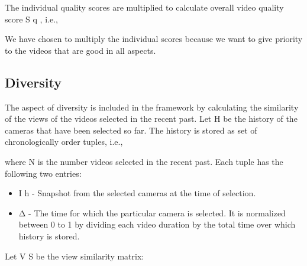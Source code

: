 \documentclass{sig-alternate}
\begin{document}
The individual quality scores are multiplied to calculate overall video quality score S q , i.e.,

We have chosen to multiply the individual scores because we want to give priority to the videos that are good in all aspects.

\subsection{Diversity}
The aspect of diversity is included in the framework by calculating the similarity of the views of the videos selected in the recent past. Let H be the history of the cameras that have been selected so far. The history is stored as set of chronologically order tuples, i.e.,

where N is the number videos selected in the recent past. Each tuple has the following two entries:
\begin{itemize}
    \item I h - Snapshot from the selected cameras at the time of selection.
    \item Δ - The time for which the particular camera is selected. It is normalized between 0 to 1 by dividing each video duration by the total time over which history is stored.
\end{itemize}
Let V S be the view similarity matrix:
\end{document}
